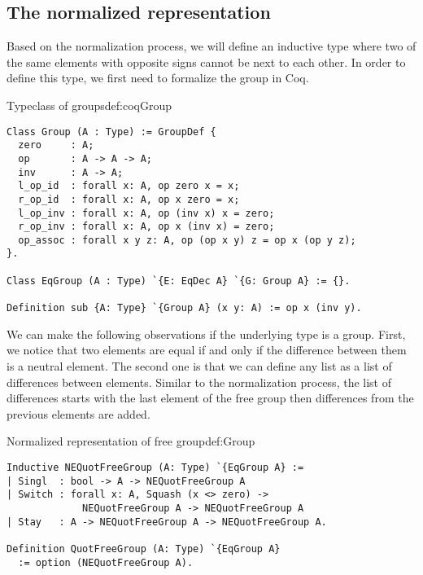 \subsection{The normalized representation}
Based on the normalization process, we will define an inductive type where two of the same elements with opposite signs cannot be next to each other. In order to define this type, we first need to formalize the group in Coq.
\begin{defi}{Typeclass of groups}{def:coqGroup}
\begin{verbatim}
Class Group (A : Type) := GroupDef {
  zero     : A;
  op       : A -> A -> A;
  inv      : A -> A;
  l_op_id  : forall x: A, op zero x = x;
  r_op_id  : forall x: A, op x zero = x;
  l_op_inv : forall x: A, op (inv x) x = zero;
  r_op_inv : forall x: A, op x (inv x) = zero;
  op_assoc : forall x y z: A, op (op x y) z = op x (op y z);
}.

Class EqGroup (A : Type) `{E: EqDec A} `{G: Group A} := {}.

Definition sub {A: Type} `{Group A} (x y: A) := op x (inv y).
\end{verbatim}
\end{defi}
We can make the following observations if the underlying type is a group. First, we notice that two elements are equal if and only if the difference between them is a neutral element. The second one is that we can define any list as a list of differences between elements. Similar to the normalization process, the list of differences starts with the last element of the free group then differences from the previous elements are added.
\begin{defi}{Normalized representation of free group}{def:Group}
\begin{verbatim}
Inductive NEQuotFreeGroup (A: Type) `{EqGroup A} :=
| Singl  : bool -> A -> NEQuotFreeGroup A
| Switch : forall x: A, Squash (x <> zero) -> 
             NEQuotFreeGroup A -> NEQuotFreeGroup A
| Stay   : A -> NEQuotFreeGroup A -> NEQuotFreeGroup A.

Definition QuotFreeGroup (A: Type) `{EqGroup A} 
  := option (NEQuotFreeGroup A).
\end{verbatim}
\end{defi}
